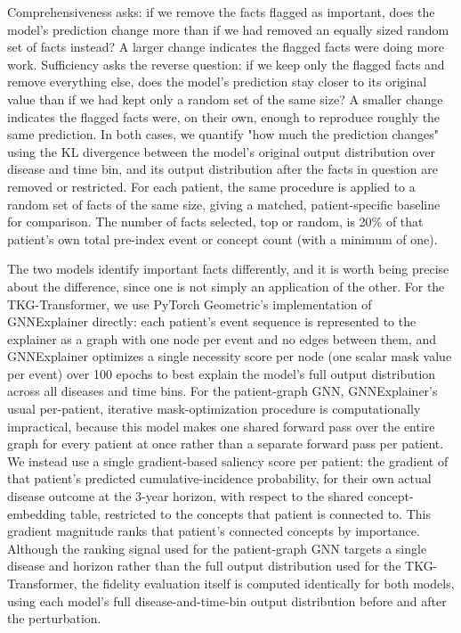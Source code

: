Comprehensiveness asks: if we remove the facts flagged as important, does the model's prediction change more than if we had removed an equally sized random set of facts instead? A larger change indicates the flagged facts were doing more work. Sufficiency asks the reverse question: if we keep only the flagged facts and remove everything else, does the model's prediction stay closer to its original value than if we had kept only a random set of the same size? A smaller change indicates the flagged facts were, on their own, enough to reproduce roughly the same prediction. In both cases, we quantify "how much the prediction changes" using the KL divergence between the model's original output distribution over disease and time bin, and its output distribution after the facts in question are removed or restricted. For each patient, the same procedure is applied to a random set of facts of the same size, giving a matched, patient-specific baseline for comparison. The number of facts selected, top or random, is 20\% of that patient's own total pre-index event or concept count (with a minimum of one).

The two models identify important facts differently, and it is worth being precise about the difference, since one is not simply an application of the other. For the TKG-Transformer, we use PyTorch Geometric's implementation of GNNExplainer directly: each patient's event sequence is represented to the explainer as a graph with one node per event and no edges between them, and GNNExplainer optimizes a single necessity score per node (one scalar mask value per event) over 100 epochs to best explain the model's full output distribution across all diseases and time bins. For the patient-graph GNN, GNNExplainer's usual per-patient, iterative mask-optimization procedure is computationally impractical, because this model makes one shared forward pass over the entire graph for every patient at once rather than a separate forward pass per patient. We instead use a single gradient-based saliency score per patient: the gradient of that patient's predicted cumulative-incidence probability, for their own actual disease outcome at the 3-year horizon, with respect to the shared concept-embedding table, restricted to the concepts that patient is connected to. This gradient magnitude ranks that patient's connected concepts by importance. Although the ranking signal used for the patient-graph GNN targets a single disease and horizon rather than the full output distribution used for the TKG-Transformer, the fidelity evaluation itself is computed identically for both models, using each model's full disease-and-time-bin output distribution before and after the perturbation.

